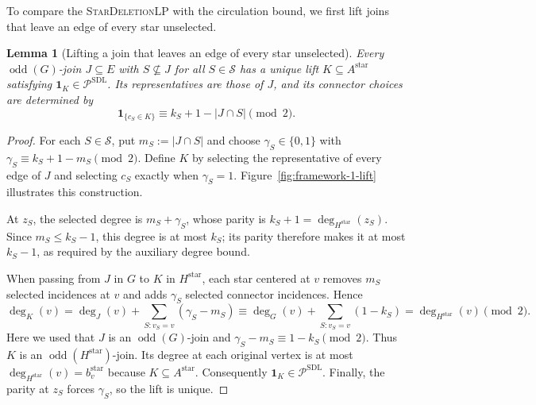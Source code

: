\documentclass[11pt]{amsart}
\DeclareMathOperator{\odd}{odd}
\newcommand{\1}{\mathbbm{1}}
\newcommand{\LPone}{\textsc{StarDeletionLP}}
\newcommand{\Pone}{\mathcal P^{\mathrm{SDL}}}
\newtheorem{lemma}[theorem]{Lemma}
\begin{document}
To compare the \LPone{} with the circulation bound,
we first lift joins that leave an edge of every star unselected.

\begin{lemma}[Lifting a join that leaves an edge of every star unselected]
\label{lem:framework-1-lift}
Every $\odd(G)$-join $J\subseteq E$ with $S\not\subseteq J$
for all $S\in\mathcal S$ has a unique lift $K\subseteq A^{\mathrm{star}}$
satisfying $\mathbf{1}_{K}\in \Pone$. Its representatives are those of $J$,
and its connector choices are determined by
\[
 \mathbf{1}_{\{c_S\in K\}}\equiv k_S+1-|J\cap S|\pmod2.
\]
\end{lemma}
\begin{proof}

For each $S\in\mathcal S$, put $m_S:=|J\cap S|$ and choose
$\gamma_S\in\{0,1\}$ with
$\gamma_S\equiv k_S+1-m_S\pmod2$.
Define $K$ by selecting the representative of every edge of $J$
and selecting $c_S$ exactly when $\gamma_S=1$.
Figure~\ref{fig:framework-1-lift} illustrates this construction.

At $z_S$, the selected degree is $m_S+\gamma_S$, whose parity
is $k_S+1=\deg_{H^{\mathrm{star}}}(z_S)$. Since $m_S\le k_S-1$, this degree is
at most $k_S$; its parity therefore makes it at most $k_S-1$,
as required by the auxiliary degree bound.

When passing from $J$ in $G$ to $K$ in $H^{\mathrm{star}}$,
each star centered at $v$ removes $m_S$ selected incidences
at $v$ and adds $\gamma_S$ selected connector incidences. Hence
\[
 \deg_K(v)=\deg_J(v)+\sum_{S:v_S=v}(\gamma_S-m_S)
 \equiv \deg_G(v)+\sum_{S:v_S=v}(1-k_S)
 =\deg_{H^{\mathrm{star}}}(v)\pmod2.
\]
Here we used that $J$ is an $\odd(G)$-join and
$\gamma_S-m_S\equiv1-k_S\pmod2$.
Thus $K$ is an $\odd(H^{\mathrm{star}})$-join. Its degree at each original
vertex is at most $\deg_{H^{\mathrm{star}}}(v)=b^{\mathrm{star}}_v$ because $K\subseteq A^{\mathrm{star}}$.
Consequently $\mathbf1_K\in\Pone$.
Finally, the parity at $z_S$ forces $\gamma_S$, so the lift is unique.
\end{proof}
\end{document}
